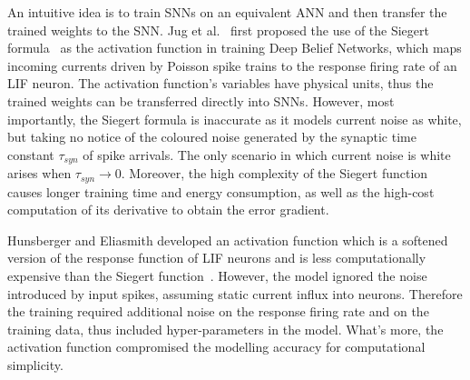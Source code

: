 \documentclass{article}
\begin{document}
An intuitive idea is to train SNNs on an equivalent ANN and then transfer the trained weights to the SNN.
Jug et al.~\cite{Jug_etal_2012} first proposed the use of the Siegert formula~\cite{siegert1951first} as the activation function in training Deep Belief Networks, which maps incoming currents driven by Poisson spike trains \texttt{}to the response firing rate of an LIF neuron.
The activation function's variables have physical units, thus the trained weights can be transferred directly into SNNs.
However, most importantly, the Siegert formula is inaccurate as it models current noise as white, but taking no notice of the coloured noise generated by the synaptic time constant $\tau_{syn}$ of spike arrivals. The only scenario in which current noise is  white arises when $\tau_{syn} \to 0$.
Moreover, the high complexity of the Siegert function causes longer training time and  energy consumption, as well as the high-cost computation of its derivative to obtain the error gradient.

Hunsberger and Eliasmith developed an activation function which is a softened version of the response function of LIF neurons and is less computationally expensive than the Siegert function~\cite{hunsberger2015spiking}.
However, the model ignored the noise introduced by input spikes, assuming static current influx into neurons.
Therefore the training required additional noise on the response firing rate and on the training data, thus included hyper-parameters in the model.
What's more, the activation function compromised the modelling accuracy for computational simplicity.
\end{document}
